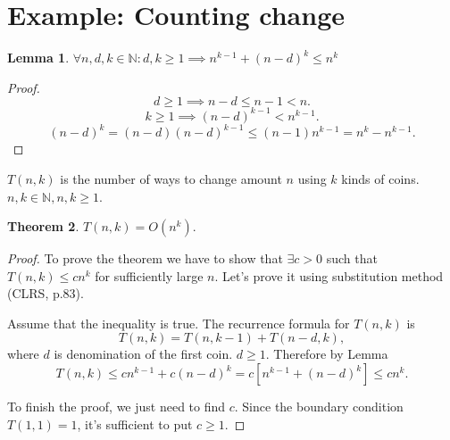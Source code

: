 \documentclass[12pt]{article}
\newtheorem{theorem}{Theorem}[section]
\newtheorem{lemma}[theorem]{Lemma}
\newenvironment{definition}[1][Definition]{\begin{trivlist}
\item[\hskip \labelsep {\bfseries #1}]}{\end{trivlist}}
\begin{document}
\section{Example: Counting change}

\begin{lemma}
    $\forall n, d, k \in \mathbb{N} : d, k \ge 1 \implies n^{k-1} + (n-d)^k \le n^k$
\end{lemma}

\begin{proof}
    $$d \ge 1 \implies n - d \le n - 1 < n.$$
    $$k \ge 1 \implies (n-d)^{k-1} < n^{k-1}.$$
    $$(n-d)^k = (n-d)(n-d)^{k-1} \le (n-1)n^{k-1} = n^k - n^{k-1}.$$
\end{proof}

\begin{definition}
    $T(n,k)$ is the number of ways to change amount $n$ using $k$ kinds of coins. $n, k \in \mathbb{N}, n, k \ge 1$.
\end{definition}

\begin{theorem}
    $T(n,k) = O(n^k).$
\end{theorem}

\begin{proof}
    To prove the theorem we have to show that $\exists c>0$ such that $T(n,k) \le cn^k$ for sufficiently large $n$.
    Let's prove it using substitution method (CLRS, p.83).

    Assume that the inequality is true.
    The recurrence formula for $T(n,k)$ is
    $$T(n,k) = T(n,k-1) + T(n-d,k),$$
    where $d$ is denomination of the first coin. $d \ge 1$. Therefore by Lemma
    $$T(n,k) \le cn^{k-1} + c(n-d)^k = c\left[n^{k-1} + (n-d)^k\right] \le cn^k.$$

    To finish the proof, we just need to find $c$. Since the boundary condition $T(1,1) = 1$, it's sufficient to put $c \ge 1$.
\end{proof}
\end{document}
